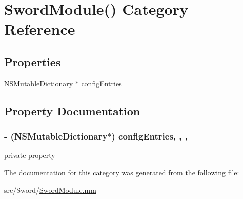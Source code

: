 \hypertarget{category_sword_module_07_08}{\section{Sword\-Module() Category Reference}
\label{category_sword_module_07_08}
}
\subsection*{Properties}
\begin{DoxyCompactItemize}
\item 
N\-S\-Mutable\-Dictionary $\ast$ \hyperlink{category_sword_module_07_08_aac92b28c82e8e90e1f41471b3f3d65dc}{config\-Entries}
\end{DoxyCompactItemize}


\subsection{Property Documentation}
\hypertarget{category_sword_module_07_08_aac92b28c82e8e90e1f41471b3f3d65dc}{
\subsubsection[{config\-Entries}]{\setlength{\rightskip}{0pt plus 5cm}-\/ (N\-S\-Mutable\-Dictionary$\ast$) config\-Entries\hspace{0.3cm}{\ttfamily [read]}, {\ttfamily [write]}, {\ttfamily [atomic]}, {\ttfamily [retain]}}}\label{category_sword_module_07_08_aac92b28c82e8e90e1f41471b3f3d65dc}
private property 

The documentation for this category was generated from the following file\-:\begin{DoxyCompactItemize}
\item 
src/\-Sword/\hyperlink{_sword_module_8mm}{Sword\-Module.\-mm}\end{DoxyCompactItemize}

